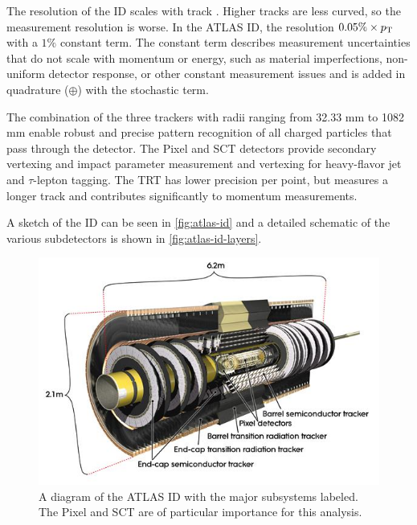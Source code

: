 

The \pt resolution of the \ac{ID} scales with track \pt. Higher \pt tracks are less curved, so the measurement resolution is worse. In the \ac{ATLAS} \ac{ID}, the \pt resolution  $0.05\% \times p_{\text{T}}$ with a $1\%$ constant term. The constant term describes measurement uncertainties that do not scale with momentum or energy, such as material imperfections, non-uniform detector response, or other constant measurement issues and is added in quadrature ($\oplus$) with the stochastic term.

The combination of the three trackers with radii ranging from 32.33 mm to 1082 mm enable robust and precise pattern recognition of all charged particles that pass through the detector. The Pixel and \ac{SCT} detectors provide secondary vertexing and impact parameter measurement and vertexing for heavy-flavor jet and $\tau$-lepton tagging. The \ac{TRT} has lower precision per point, but measures a longer track and contributes significantly to momentum measurements.


A sketch of the \ac{ID} can be seen in \autoref{fig:atlas-id} and a detailed schematic of the various subdetectors is shown in \autoref{fig:atlas-id-layers}. 


\begin{figure}[!h]
\centering
\includegraphics[width=.8\textwidth]{figures/Detector/atlas-ID.jpg}
\caption{A diagram of the \ac{ATLAS} \ac{ID} with the major subsystems labeled. The Pixel and \ac{SCT} are of particular importance for this analysis.}
\label{fig:atlas-id}
\end{figure}

